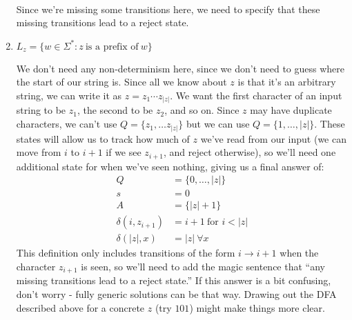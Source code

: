\documentclass[fleqn]{article}
\begin{document}
\begin{enumerate}
\begin{answer}
 \\
        Since we're missing some transitions here, we need to specify that these missing transitions lead to a reject state.
    \end{answer}
    \item $L_z = \{w \in \Sigma^* : z~\text{is a prefix of}~w\}$
    \begin{answer}
        We don't need any non-determinism here, since we don't need to guess where the start of our string is. Since all we know about $z$ is that it's an arbitrary string, we can write it as $z = z_1\cdots z_{|z|}$. We want the first character of an input string to be $z_1$, the second to be $z_2$, and so on. Since $z$ may have duplicate characters, we can't use $Q = \{z_1,\dots z_{|z|}\}$ but we can use $Q = \{1, \dots, |z|\}$. These states will allow us to track how much of $z$ we've read from our input (we can move from $i$ to $i+1$ if we see $z_{i+1}$, and reject otherwise), so we'll need one additional state for when we've seen nothing, giving us a final answer of:
        \[
            \begin{aligned}
                Q &= \{0,\dots,|z|\} \\
                s &= 0 \\
                A &= \{|z| + 1\} \\
                \delta(i, z_{i+1}) &= i + 1 ~\text{for } i < |z| \\
                \delta(|z|, x) &= |z| ~\forall x
            \end{aligned}
        \]
        This definition only includes transitions of the form $i \to i+1$ when the character $z_{i+1}$ is seen, so we'll need to add the magic sentence that ``any missing transitions lead to a reject state.'' If this answer is a bit confusing, don't worry - fully generic solutions can be that way. Drawing out the DFA described above for a concrete $z$ (try $101$) might make things more clear.
    \end{answer}
\end{enumerate}
\end{document}

